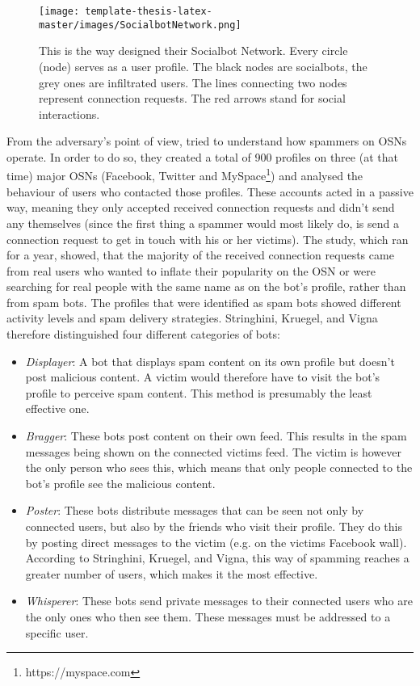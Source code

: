         
        \begin{figure*}[h]
        	\centering
        	\texttt{[image: template-thesis-latex-master/images/SocialbotNetwork.png]}
        	\caption{This is the way \textcite[561]{DesignAnalysis} designed their Socialbot Network. Every circle (node) serves as a user profile. The black nodes are socialbots, the grey ones are infiltrated users. The lines connecting two nodes represent connection requests. The red arrows stand for social interactions. 
        	}
        	\label{figure:socialbotnet}
        	
        \end{figure*}
        
         
         From the adversary’s point of view, \textcite[1, 3-5]{DetectingSpammers} tried to understand how spammers on OSNs operate. In order to do so, they created a total of 900 profiles on three (at that time) major OSNs (Facebook, Twitter and MySpace\footnote{https://myspace.com}) and analysed the behaviour of users who contacted those profiles. These accounts acted in a passive way, meaning they only accepted received connection requests and didn’t send any themselves (since the first thing a spammer would most likely do, is send a connection request to get in touch with his or her victims). The study, which ran for a year, showed, that the majority of the received connection requests came from real users who wanted to inflate their popularity on the OSN or were searching for real people with the same name as on the bot's profile, rather than from spam bots. The profiles that were identified as spam bots showed different activity levels and spam delivery strategies.  Stringhini, Kruegel, and Vigna therefore distinguished four different categories of bots:
          \begin{itemize}
        	\item \textit{Displayer}: A bot that displays spam content on its own profile but doesn’t post malicious content. A victim would therefore have to visit the bot’s profile to perceive spam content. This method is presumably the least effective one.
        	\item \textit{Bragger}: These bots post content on their own feed. This results in the spam messages being shown on the connected victims feed. The victim is however the only person who sees this, which means that only people connected to the bot’s profile see the malicious content.
        	\item \textit{Poster}: These bots distribute messages that can be seen not only by connected users, but also by the friends who visit their profile. They do this by posting direct messages to the victim (e.g. on the victims Facebook wall). According to Stringhini, Kruegel, and Vigna, this way of spamming reaches a greater number of users, which makes it the most effective.
        	\item \textit{Whisperer}: These bots send private messages to their connected users who are the only ones who then see them. These messages must be addressed to a specific user.
        \end{itemize}
    
